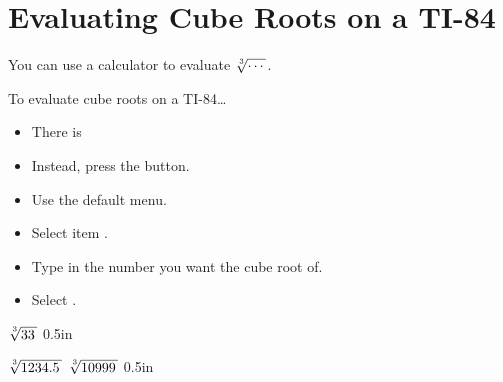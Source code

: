 \section{Evaluating Cube Roots on a TI-84}

You can use a calculator to evaluate $\myRoot[3]{\cdots}$. 

\begin{myConcept}{To evaluate cube roots on a TI-84\dots}
    \begin{itemize}
        \setlength\itemsep{0.4em}
        \item There is  
        \item Instead, press the  button.
        \item Use the default  menu.
        \item Select item .
        \item Type in the number you want the cube root of.
        \item Select .
    \end{itemize}
\end{myConcept}

{
    $\myRoot[3]{33}$
}
{0.5in}

\myProblems
{
    $\myRoot[3]{1234.5}$
}
{
    $\myRoot[3]{10999}$
}
{0.5in}